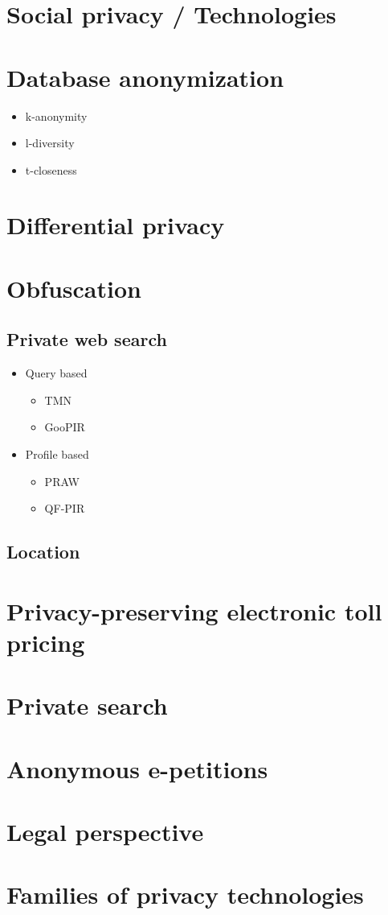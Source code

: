 \documentclass[a4paper,12pt,dutch]{article}
\begin{document}
\section{Social privacy / Technologies}

\section{Database anonymization}
\begin{itemize}
	\item k-anonymity
	\item l-diversity
	\item t-closeness
\end{itemize}

\section{Differential privacy}

\section{Obfuscation}
\subsection{Private web search}
\begin{itemize}
	\item Query based
	\begin{itemize}
		\item TMN
		\item GooPIR
	\end{itemize}
	\item Profile based
	\begin{itemize}
		\item PRAW
		\item QF-PIR
	\end{itemize}
\end{itemize}
\subsection{Location}

\section{Privacy-preserving electronic toll pricing}

\section{Private search}

\section{Anonymous e-petitions}

\section{Legal perspective}

\section{Families of privacy technologies}
\end{document}
